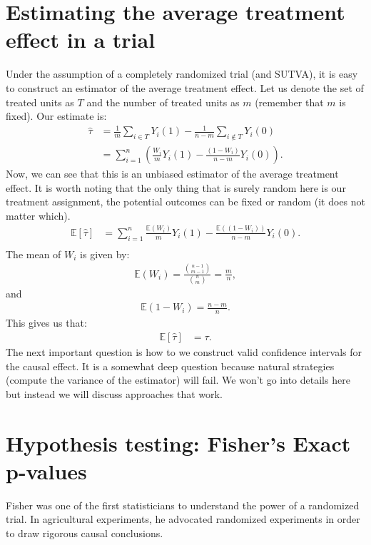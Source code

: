 \documentclass[twoside,12pt]{article}
\begin{document}
\section{Estimating the average treatment effect in a trial}
Under the assumption of a completely randomized trial (and SUTVA), it is easy to construct an estimator
of the average treatment effect. Let us denote the set of treated units as $T$ and the number
of treated units as $m$ (remember that $m$ is fixed). Our estimate is:
\begin{align*}
\widehat{\tau} &= \frac{1}{m} \sum_{i \in T} Y_i(1) - \frac{1}{n - m} \sum_{i \notin T} Y_i(0) \\
&=  \sum_{i=1}^n \left( \frac{W_i}{m} Y_i(1) - \frac{(1 - W_i)}{n-m} Y_i(0)\right).
\end{align*}
Now, we can see that this is an unbiased estimator of the average treatment effect.
It is worth noting that the only thing that is surely random here is our treatment assignment, the potential outcomes can be fixed or random (it does not matter which). 
\begin{align*}
\mathbb{E} [\widehat{\tau}] &= \sum_{i=1}^n \frac{ \mathbb{E} \left(W_i\right) }{m} Y_i(1) - 
\frac{\mathbb{E} \left( (1 - W_i) \right)}{n - m} Y_i(0). \\
\end{align*}
The mean of $W_i$ is given by:
\begin{align*}
\mathbb{E}(W_i) = \frac{{n-1 \choose m-1}}{{n \choose m}} = \frac{m}{n},
\end{align*}
and 
\begin{align*}
\mathbb{E}(1 - W_i) = \frac{n - m}{n}.
\end{align*}
This gives us that:
\begin{align*}
\mathbb{E} [\widehat{\tau}] &= \tau.
\end{align*}
The next important question is how to we construct valid confidence intervals for the causal effect.
It is a somewhat deep question because natural strategies (compute the variance of the estimator) will fail. We won't go into details here but instead we will discuss approaches that work.

\section{Hypothesis testing: Fisher's Exact p-values}
Fisher was one of the first statisticians to understand the power of a randomized trial. In agricultural experiments, he advocated randomized experiments in order to draw rigorous causal conclusions. 
\end{document}
